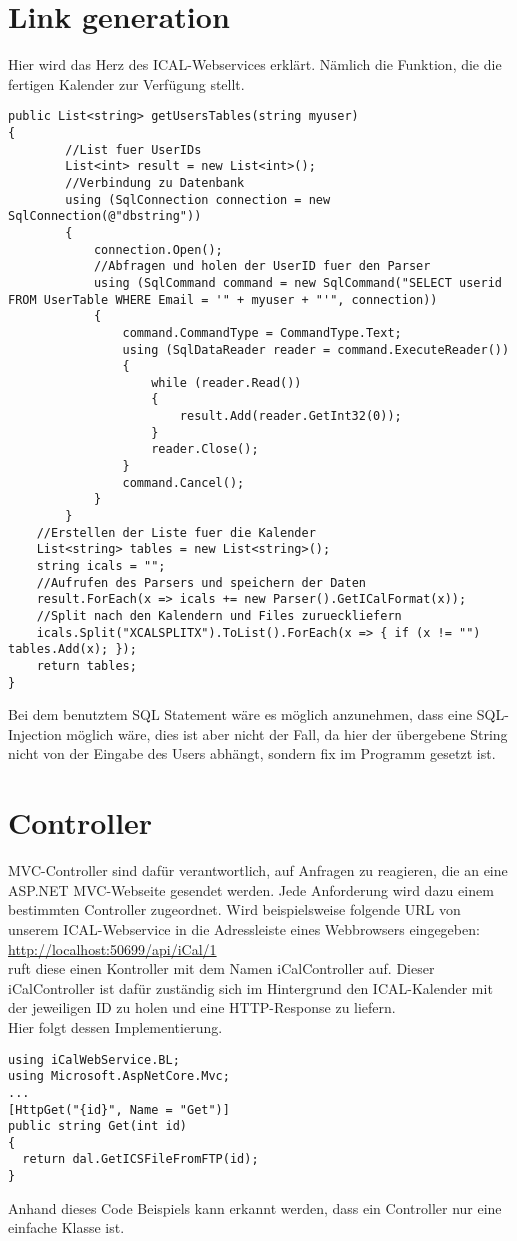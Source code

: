 {\section{Link generation}
\label{sec:link}
Hier wird das Herz des ICAL-Webservices erklärt. Nämlich die Funktion, die die fertigen Kalender zur Verfügung stellt.
\begin{lstlisting}[caption={Link erzeugung}]
public List<string> getUsersTables(string myuser)
{
        //List fuer UserIDs
        List<int> result = new List<int>();
        //Verbindung zu Datenbank
        using (SqlConnection connection = new SqlConnection(@"dbstring"))
        {
            connection.Open();
            //Abfragen und holen der UserID fuer den Parser
            using (SqlCommand command = new SqlCommand("SELECT userid FROM UserTable WHERE Email = '" + myuser + "'", connection))
            {
                command.CommandType = CommandType.Text;
                using (SqlDataReader reader = command.ExecuteReader())
                {
                    while (reader.Read())
                    {
                        result.Add(reader.GetInt32(0));
                    }
                    reader.Close();
                }
                command.Cancel();
            }
        }
    //Erstellen der Liste fuer die Kalender
    List<string> tables = new List<string>();
    string icals = "";
    //Aufrufen des Parsers und speichern der Daten
    result.ForEach(x => icals += new Parser().GetICalFormat(x));
    //Split nach den Kalendern und Files zurueckliefern
    icals.Split("XCALSPLITX").ToList().ForEach(x => { if (x != "") tables.Add(x); });
    return tables;
}
\end{lstlisting}
Bei dem benutztem SQL Statement wäre es möglich anzunehmen, dass eine SQL-Injection möglich wäre, dies ist aber nicht der Fall, da hier der übergebene String nicht von der Eingabe des Users abhängt, sondern fix im Programm gesetzt ist.
\section{Controller}
\label{sec:Controller}
MVC-Controller sind dafür verantwortlich, auf Anfragen zu reagieren, die an eine ASP.NET MVC-Webseite gesendet werden. Jede Anforderung wird dazu einem bestimmten Controller zugeordnet. Wird beispielsweise folgende URL von unserem ICAL-Webservice in die Adressleiste eines Webbrowsers eingegeben:\\
\url{http://localhost:50699/api/iCal/1} \\
ruft diese einen Kontroller mit dem Namen iCalController auf. Dieser iCalController ist dafür zuständig sich im Hintergrund den ICAL-Kalender mit der jeweiligen ID zu holen und eine HTTP-Response zu liefern.\\ Hier folgt dessen Implementierung. 
\begin{lstlisting}[caption={Controller Code example}]
using iCalWebService.BL;
using Microsoft.AspNetCore.Mvc;
...
[HttpGet("{id}", Name = "Get")]
public string Get(int id)
{
  return dal.GetICSFileFromFTP(id);
}
\end{lstlisting}
Anhand dieses Code Beispiels kann erkannt werden, dass ein Controller nur eine einfache Klasse ist. 
}
